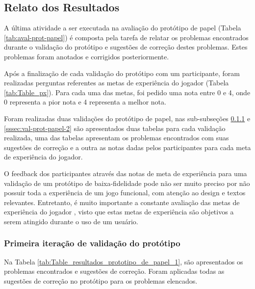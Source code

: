 \begin{apendicesenv}
{\subsection{Relato dos Resultados}

A última atividade a ser executada na avaliação do protótipo de papel (Tabela \ref{tab:aval-prot-papel}) é composta pela tarefa de relatar os problemas encontrados durante o validação do protótipo e sugestões de correção destes problemas. Estes problemas foram anotados e corrigidos posteriormente.

Após a finalização de cada validação do protótipo com um participante, foram realizadas perguntas referentes as metas de experiência do jogador (Tabela \ref{tab:Table_px}). Para cada uma das metas, foi pedido uma nota entre 0 e 4, onde 0 representa a pior nota e 4 representa a melhor nota.

Foram realizadas duas validações do protótipo de papel, nas sub-subseções \ref{sssec:val-prot-papel-1} e \ref{sssec:val-prot-papel-2} são apresentados duas tabelas para cada validação realizada, uma das tabelas apresentam os problemas encontrados com suas sugestões de correção e a outra as notas dadas pelos participantes para cada meta de experiência do jogador.

O feedback dos participantes através das notas de meta de experiência para uma validação de um protótipo de baixa-fidelidade pode não ser muito preciso por não possuir toda a experiência de um jogo funcional, com atenção ao design e textos relevantes. Entretanto, é muito importante a constante avaliação das metas de experiência do jogador \cite{Fullerton_2008}, visto que estas metas de experiência são objetivos a serem atingido durante o uso de um usuário.

\subsubsection{Primeira iteração de validação do protótipo} \label{sssec:val-prot-papel-1}

Na Tabela \ref{tab:Table_resultados_prototipo_de_papel_1}, são apresentados os problemas encontrados e sugestões de correção. Foram aplicadas todas as sugestões de correção no protótipo para os problemas elencados.

}
\end{apendicesenv}
